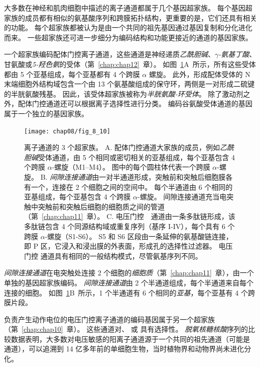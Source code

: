 大多数在神经和肌肉细胞中描述的离子通道都属于几个基因超家族。
每个基因超家族的成员都有相似的氨基酸序列和跨膜拓扑结构，更重要的是，它们还具有相关的功能。
每个超家族都被认为是由一个共同的祖先基因通过基因复制和分化进化而来。
一些超家族还可进一步细分为编码结构和功能更接近的通道的基因家族。


一个超家族编码配体门控离子通道，这些通道是神经递质\textit{乙酰胆碱}、\textit{$\gamma$-氨基丁酸}、甘氨酸或\textit{5-羟色氨}的受体（第~\ref{chap:chap12}~章）。 
如图~\ref{fig:8_10}A~所示，所有这些受体都由 5 个亚基组成，每个亚基都有 4 个跨膜 $\alpha$ 螺旋。
此外，形成配体受体的 N 末端细胞外结构域包含一个由 13 个氨基酸组成的保守环，两侧是一对形成二硫键的半胱氨酸残基。
因此，该受体超家族被称为\textit{半胱氨酸-环受体}。
除了激动剂之外，配体门控通道还可以根据离子选择性进行分类。
编码谷氨酸受体通道的基因属于一个独立的基因家族。


\begin{figure}[htbp]
	\centering
	\texttt{[image: chap08/fig\_8\_10]}
	\caption{离子通道的 3 个超家族。
		A. 配体门控通道大家族的成员，例如\textit{乙酰胆碱}受体通道，由 5 个相同或密切相关的亚基组成，每个亚基包含 4 个跨膜 $\alpha$-螺旋（M1–M4）。
		图中的每个圆柱体代表一个跨膜 $\alpha$-螺旋。
		B. \textit{间隙连接通道}由一对半通道形成，突触前和突触后细胞膜各有一个，连接在 2 个细胞之间的空间中。
		每个半通道由 6 个相同的亚基组成，每个亚基包含 4 个跨膜 $\alpha$-螺旋。
		间隙连接通道充当电突触中突触前和突触后细胞的细胞质之间的管道（第~\ref{chap:chap11}~章）。
		C. 电压门控~~通道由一条多肽链形成，该多肽链包含 4 个同源结构域或重复序列（基序 I-IV），每个具有 6 个跨膜 $\alpha$-螺旋（S1-S6）。
		S5 和 S6 区段由一条延伸的氨基酸链连接，即 P 区，它浸入和浸出膜的外表面，形成孔的选择性过滤器。
		电压门控  通道具有相同的一般结构模式，尽管氨基序列不同。}
	\label{fig:8_10}
\end{figure}




\textit{间隙连接通道}在电突触处连接 2 个细胞的\textit{细胞质}（第~\ref{chap:chap11}~章），由一个单独的基因超家族编码。
\textit{间隙连接通道}由 2 个半通道组成，每个半通道来自每个连接的细胞。
如图~\ref{fig:8_10}B~所示，1 个半通道有 6 个相同的\textit{亚基}，每个亚基有 4 个跨膜片段。


负责产生动作电位的电压门控离子通道的编码基因属于另一个超家族（第~\ref{chap:chap10}~章）。
这些通道对、 或  具有选择性。
\textit{脱氧核糖核酸}序列的比较数据表明，大多数对电压敏感的阳离子通道源于一个共同的祖先通道（可能是  通道），可以追溯到 14 亿多年前的单细胞生物，当时植物界和动物界尚未进化分化。


